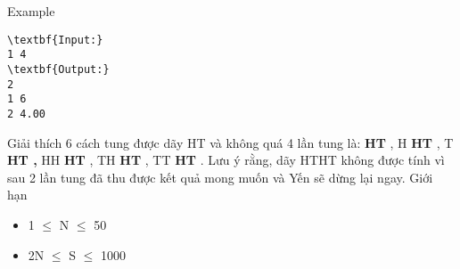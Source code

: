 Example
\begin{verbatim}
\textbf{Input:}
1 4
\textbf{Output:}
2
1 6
2 4.00\end{verbatim}
Giải thích
6 cách tung được dãy HT và không quá 4 lần tung là: \textbf{HT} , H \textbf{HT} , T \textbf{ HT , } HH \textbf{HT} , TH \textbf{HT} , TT \textbf{ HT} . Lưu ý rằng, dãy HTHT không được tính vì sau 2 lần tung đã thu được kết quả mong muốn và Yến sẽ dừng lại ngay.
Giới hạn
\begin{itemize}
	\item 1  $\le$  N  $\le$  50
	\item 2N  $\le$  S  $\le$  1000
\end{itemize}